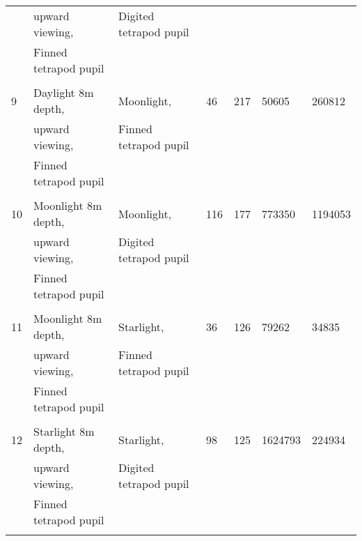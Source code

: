 \begin{tabular}{lllllll}
&upward viewing,&Digited tetrapod pupil&&&&\\\
&Finned tetrapod pupil&&&&&\\\\\hline
9&Daylight 8m depth,&Moonlight,&46&217&50605&260812\\\
&upward viewing,&Finned tetrapod pupil&&&&\\\
&Finned tetrapod pupil&&&&&\\\\\hline
10&Moonlight 8m depth,&Moonlight,&116&177&773350&1194053\\\
&upward viewing,&Digited tetrapod pupil&&&&\\\
&Finned tetrapod pupil&&&&&\\\\\hline
11&Moonlight 8m depth,&Starlight,&36&126&79262&34835\\\
&upward viewing,&Finned tetrapod pupil&&&&\\\
&Finned tetrapod pupil&&&&&\\\\\hline
12&Starlight 8m depth,&Starlight,&98&125&1624793&224934\\\
&upward viewing,&Digited tetrapod pupil&&&&\\\
&Finned tetrapod pupil&&&&&\\\\\hline
\bottomrule
\end{tabular}
